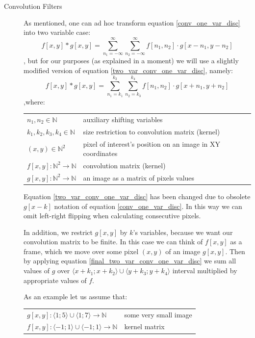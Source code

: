 \documentclass{article}
\makeatletter
\newenvironment{conditions}
  {\par\vspace{\abovedisplayskip}\noindent\begin{tabular}{>{$}l<{$} @{${}\equiv{}$} l}}
  {\end{tabular}\par\vspace{\belowdisplayskip}}
\makeatother
\begin{document}
\begin{description}
\item[Convolution Filters]
As mentioned, one can ad hoc transform equation \ref{conv_one_var_disc} into two variable case:
\begin{equation} \label{two_var_conv_one_var_disc}
f[x,y] * g[x,y] =\sum_{n_{1}=-\infty}^{\infty} \sum_{n_{2}=-\infty}^{\infty} f[n_{1}, n_{2}] \cdot g[x-n_{1}, y - n_{2}]
\end{equation}
, but for our purposes (as explained in a moment) we will use a slightly modified version of equation \ref{two_var_conv_one_var_disc}, namely:
\begin{equation} \label{final_two_var_conv_one_var_disc}
f[x,y] * g[x,y] =\sum_{n_{1}=k_{1}}^{k_{2}} \sum_{n_{2}=k_{3}}^{k_{4}} f[n_{1}, n_{2}] \cdot g[x+n_{1}, y + n_{2}]
\end{equation}
,where:
\begin{conditions} 
  n_{1}, n_{2} \in \mathbb{N}& auxiliary shifting variables\\
  k_{1}, k_{2}, k_{3}, k_{4} \in \mathbb{N}& size restriction to convolution matrix (kernel)\\
 (x,y) \in \mathbb{N}^{2}     &  pixel of interest's position on an image in XY coordinates \\   
 f[x,y] : \mathbb{N}^{2} \rightarrow \mathbb{N} &  convolution matrix (kernel) \\
 g[x,y] : \mathbb{N}^{2} \rightarrow \mathbb{N} & an image as a matrix of pixels values
\end{conditions}

Equation \ref{two_var_conv_one_var_disc} has been changed due to obsolete $g[x-k]$ notation of equation \ref{conv_one_var_disc}. In this way we can omit left-right flipping when calculating consecutive pixels.

In addition, we restrict $g[x,y]$ by $k$'s variables, because we want our convolution matrix to be finite. 
In this case we can think of $f[x,y]$ as a frame, which we move over some pixel $(x,y)$ of an image $g[x,y]$. Then by applying equation \ref{final_two_var_conv_one_var_disc} we sum all values of $g$ over
$ \langle x + k_1; x+ k_2 \rangle \cup \langle y + k_3 ; y + k_4 \rangle$ interval multiplied by appropriate values of $f$. 

As an example let us assume that:
\begin{conditions} 
  g[x,y] : \langle 1; 5 \rangle \cup \langle 1 ; 7 \rangle \rightarrow \mathbb{N} & some very small image\\
  f[x,y] : \langle -1; 1 \rangle \cup \langle -1 ; 1 \rangle \rightarrow \mathbb{N} & kernel matrix
\end{conditions}


\end{description}
\end{document}
